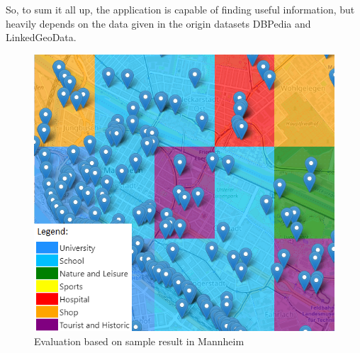  So, to sum it all up, the application is capable of finding useful information, but heavily depends on the data given in the origin datasets DBPedia and LinkedGeoData.

\begin{figure}
  \centering
    \includegraphics[scale=0.5]{./content/sample.PNG}
  \caption{Evaluation based on sample result in Mannheim}\label{fig:eval}
\end{figure}
